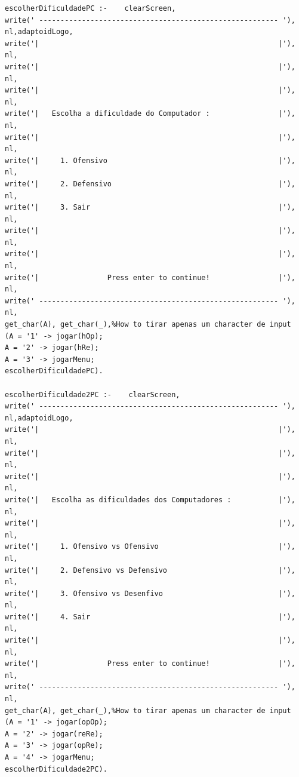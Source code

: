 \documentclass[a4paper]{article}
\begin{document}
\begin{lstlisting}
escolherDificuldadePC :-    clearScreen,
write(' -------------------------------------------------------- '), nl,adaptoidLogo,
write('|                                                        |'), nl,
write('|                                                        |'), nl,
write('|                                                        |'), nl,
write('|   Escolha a dificuldade do Computador :                |'), nl,
write('|                                                        |'), nl,
write('|     1. Ofensivo                                        |'), nl,
write('|     2. Defensivo                                       |'), nl,
write('|     3. Sair                                            |'), nl,
write('|                                                        |'), nl,
write('|                                                        |'), nl,
write('|                Press enter to continue!                |'), nl,
write(' -------------------------------------------------------- '), nl,
get_char(A), get_char(_),%How to tirar apenas um character de input
(A = '1' -> jogar(hOp);
A = '2' -> jogar(hRe);
A = '3' -> jogarMenu;
escolherDificuldadePC).

escolherDificuldade2PC :-    clearScreen,
write(' -------------------------------------------------------- '), nl,adaptoidLogo,
write('|                                                        |'), nl,
write('|                                                        |'), nl,
write('|                                                        |'), nl,
write('|   Escolha as dificuldades dos Computadores :           |'), nl,
write('|                                                        |'), nl,
write('|     1. Ofensivo vs Ofensivo                            |'), nl,
write('|     2. Defensivo vs Defensivo                          |'), nl,
write('|     3. Ofensivo vs Desenfivo                           |'), nl,
write('|     4. Sair                                            |'), nl,
write('|                                                        |'), nl,
write('|                Press enter to continue!                |'), nl,
write(' -------------------------------------------------------- '), nl,
get_char(A), get_char(_),%How to tirar apenas um character de input
(A = '1' -> jogar(opOp);
A = '2' -> jogar(reRe);
A = '3' -> jogar(opRe);
A = '4' -> jogarMenu;
escolherDificuldade2PC).


\end{lstlisting}
\end{document}
